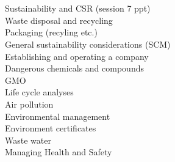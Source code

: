 \begin{itemize}
\\\\
Sustainability and CSR (session 7 ppt)
\\Waste disposal and recycling
\\Packaging (recyling etc.)
\\General sustainability considerations (SCM)
\\Establishing and operating a company
\\Dangerous chemicals and compounds
\\GMO
\\Life cycle analyses
\\Air pollution
\\Environmental management
\\Environment certificates
\\Waste water
\\Managing Health and Safety


\end{itemize}